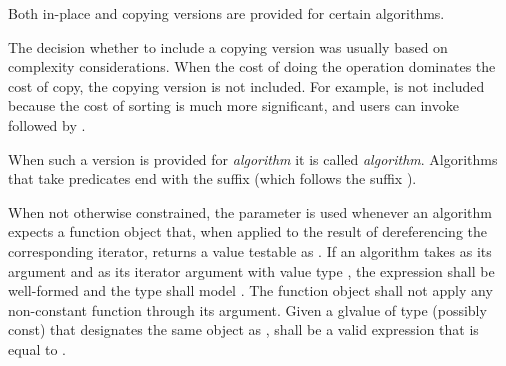\pnum
Both in-place and copying versions are provided for certain algorithms.
\begin{footnote}
The decision whether to include a copying version was
usually based on complexity considerations.
When the cost of doing the operation dominates the cost of copy,
the copying version is not included.
For example,  is not included
because the cost of sorting is much more significant,
and users can invoke  followed by .
\end{footnote}
When such a version is provided for \textit{algorithm} it is called
\textit{algorithm}.
Algorithms that take predicates end with the suffix 
(which follows the suffix ).

\pnum
When not otherwise constrained, the  parameter is used
whenever an algorithm expects a function object that,
when applied to the result of dereferencing the corresponding iterator,
returns a value testable as .
If an algorithm takes  as its argument and
 as its iterator argument with value type ,
the expression  shall be well-formed and
the type  shall model
.
The function object  shall not apply any non-constant function
through its argument.
Given a glvalue  of type (possibly const) 
that designates the same object as ,
 shall be a valid expression
that is equal to .

